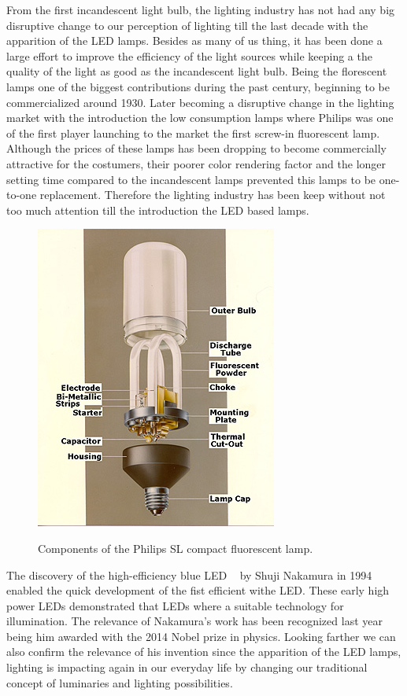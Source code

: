 From the first incandescent light bulb, the lighting industry has not had any big disruptive change to our perception of lighting till the last decade with the apparition of the LED lamps. Besides as many of us thing, it has been done a large effort to improve the efficiency of the light sources while keeping a the quality of the light as good as the incandescent light bulb. Being the florescent lamps one of the biggest contributions during the past century, beginning  to be commercialized around 1930. Later becoming a disruptive change in the lighting market with the introduction the low consumption lamps where Philips was one of the first player launching to the market the first screw-in fluorescent lamp. Although the prices of these lamps has been dropping to become commercially attractive for the costumers, their poorer color rendering factor and the longer setting time compared to the incandescent lamps prevented this lamps to be one-to-one replacement. Therefore the lighting industry has been keep without not too much attention till the introduction the LED based lamps.

\begin{figure}[!h]
\centering
\includegraphics{./0_intro/img/phil1b.jpg}
\label{fig:philips_sl}
\caption{Components of the Philips SL compact fluorescent lamp. }
\end{figure}

The discovery of the high-efficiency blue LED ~\cite{94Nakamura} by Shuji Nakamura in 1994 enabled the quick development of the fist efficient withe LED. These early high power LEDs demonstrated that LEDs where a suitable technology for illumination. The relevance of Nakamura's work has been recognized last year being him awarded with the 2014 Nobel prize in physics. Looking farther we can also confirm the relevance of his invention since the apparition of the LED lamps, lighting is impacting again in our everyday life by changing our traditional concept of luminaries and lighting possibilities. 

